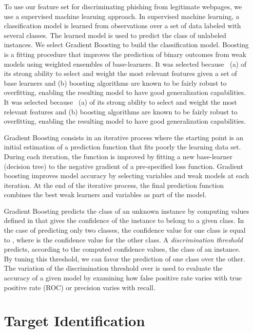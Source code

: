 \documentclass[10pt,conference,compsocconf,letterpaper]{IEEEtran}
\begin{document}
To use our feature set for discriminating phishing from legitimate webpages, we use a supervised machine learning approach. In supervised machine learning, a classification model is learned from observations over a set of data labeled with several classes. The learned model is used to predict the class of unlabeled instances. 
We select Gradient Boosting  \cite{friedman:2002:stochastic} to build the classification model.
\iffeateval
Boosting \cite{freund:1999:ashort} is a fitting procedure that improves the prediction of binary outcomes from weak models using weighted ensembles of base-learners.
It was selected because~\cite{buhlmann:2007:boosting} (a) of its strong ability to select and weight the most relevant features given a set of base learners and (b) boosting algorithms are known to be fairly robust to overfitting, enabling the resulting model to have good generalization capabilities.
\else
It was selected because~\cite{buhlmann:2007:boosting} (a) of its strong ability to select and weight the most relevant features
and (b) boosting algorithms are known to be fairly robust to overfitting, enabling the resulting model to have good generalization capabilities.
\fi


\iffullversion
Gradient Boosting consists in an iterative process where the starting point is an initial estimation of a prediction function that fits poorly the learning data set. During each iteration, the function is improved by fitting a new base-learner (decision tree) to the negative gradient of a pre-specified loss function. Gradient boosting improves model accuracy by selecting variables and weak models at each iteration. At the end of the iterative process, the final prediction function combines the best weak learners and variables as part of the model.
\fi

Gradient Boosting predicts the class of an unknown instance by computing values defined in  that gives the confidence of the instance to belong to a given class. In the case of predicting only two classes, the confidence value  for one class is equal to , where  is the confidence value for the other class. A \emph{discrimination threshold} predicts, according to the computed confidence values, the class of an instance. By tuning this threshold, we can favor the prediction of one class over the other.
The variation of the discrimination threshold over  is used to evaluate the accuracy of a given model by examining how false positive rate varies with true positive rate (ROC) or precision varies with recall.
\section{Target Identification}
\label{sec:target}
\end{document}
